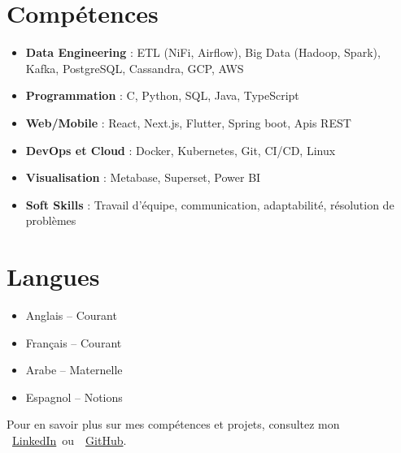 \documentclass[10pt,a4paper,sans]{moderncv}
\begin{document}
  \section{\fontsize{11}{12.1}\selectfont Compétences}
  \vspace{-6pt}
  \begin{itemize}[leftmargin=0.3cm, itemsep=-2pt, topsep=0pt, partopsep=0pt, parsep=0pt]
    \item \textbf{Data Engineering} : ETL (NiFi, Airflow), Big Data (Hadoop, Spark), Kafka, PostgreSQL, Cassandra, GCP, AWS
    \item \textbf{Programmation} : C, Python, SQL, Java, TypeScript
    \item \textbf{Web/Mobile} : React, Next.js, Flutter, Spring boot, Apis REST
    \item \textbf{DevOps et Cloud} : Docker, Kubernetes, Git, CI/CD, Linux
    \item \textbf{Visualisation} : Metabase, Superset, Power BI
    \item \textbf{Soft Skills} : Travail d’équipe, communication, adaptabilité, résolution de problèmes
  \end{itemize}

  \vspace{-18pt}
  \section{\fontsize{11}{12.1}\selectfont Langues}
  \vspace{-19pt}
  \begin{multicols}{2}
  \begin{itemize}[leftmargin=0.3cm, itemsep=-2pt, topsep=0pt, partopsep=0pt, parsep=0pt]
      \item Anglais – Courant
      \item Français – Courant
      \item Arabe – Maternelle
      \item Espagnol – Notions
  \end{itemize}
  \end{multicols}


  \vspace{-22pt}
  \begin{center}
      {\fontsize{9}{11}\selectfont\color{gray}
      Pour en savoir plus sur mes compétences et projets, consultez mon~
      \faLinkedin~\href{https://www.linkedin.com/in/ahmed-makroum/}{LinkedIn}~ou~\faGithub~\href{https://github.com/ahmedmakroum}{GitHub}.}
  \end{center}

  
\end{document}
